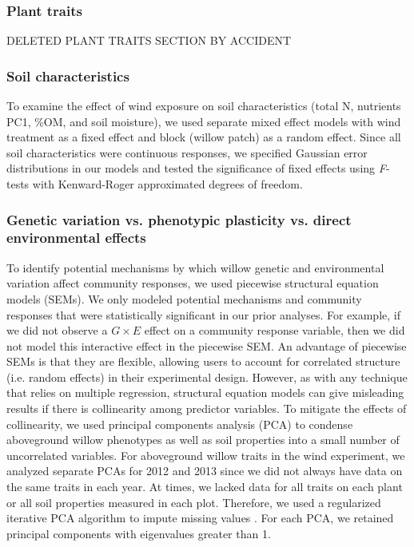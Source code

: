 \documentclass[11pt]{article}
\begin{document}
\subsubsection*{Plant traits}

DELETED PLANT TRAITS SECTION BY ACCIDENT

\subsubsection*{Soil characteristics}

To examine the effect of wind exposure on soil characteristics (total N,
nutrients PC1, \%OM, and soil moisture), we used separate mixed effect
models with wind treatment as a fixed effect and block (willow patch) as
a random effect. Since all soil characteristics were continuous
responses, we specified Gaussian error distributions in our models and
tested the significance of fixed effects using \emph{F}-tests with
Kenward-Roger approximated degrees of freedom.

\subsubsection*{Genetic variation vs. phenotypic plasticity vs.
direct environmental
effects}

To identify potential mechanisms by which willow genetic and
environmental variation affect community responses, we used piecewise
structural equation models (SEMs)\cite{Lefcheck_2015}. We only modeled
potential mechanisms and community responses that were statistically
significant in our prior analyses. For example, if we did not observe a
\(G\times E\) effect on a community response variable, then we did
not model this interactive effect in the piecewise SEM. An advantage of
piecewise SEMs is that they are flexible, allowing users to account for
correlated structure (i.e. random effects) in their experimental design.
However, as with any technique that relies on multiple regression,
structural equation models can give misleading results if there is
collinearity among predictor variables. To mitigate the effects of
collinearity, we used principal components analysis (PCA) to condense
aboveground willow phenotypes as well as soil properties into a small
number of uncorrelated variables. For aboveground willow traits in the
wind experiment, we analyzed separate PCAs for 2012 and 2013 since we
did not always have data on the same traits in each year. At times, we
lacked data for all traits on each plant or all soil properties measured
in each plot. Therefore, we used a regularized iterative PCA algorithm
to impute missing values \cite{josse2012handling}. For each PCA, we retained
principal components with eigenvalues greater than 1.
\end{document}
